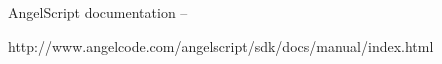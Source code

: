 \documentclass[a4paper, 12pt]{report}
\begin{document}
\begin{thebibliography}{9}
AngelScript documentation -- 

http://www.angelcode.com/angelscript/sdk/docs/manual/index.html

\end{thebibliography}

\clearpage
{}
\listoffigures

\clearpage
{}
\listoftables
\end{document}
